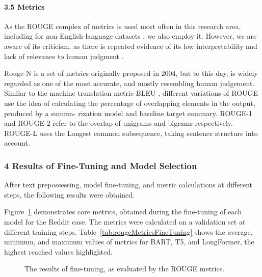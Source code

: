 \paragraph{3.5 Metrics}
As the ROUGE complex of metrics is used most often in this research area, including for non-English-language datasets \cite{ErtamAydin}, we also employ it. However, we are aware of its criticism, as there is repeated evidence of its low interpretability and lack of relevance to human judgment \cite{LiuLiu,KryscinskiKeskarMcCann}.

Rouge-N \cite{Lin} is a set of metrics originally proposed in 2004, but to this day, is widely regarded as one of the most accurate, and mostly resembling human judgement. Similar to the machine translation metric BLEU \cite{PapineniRoukosWard}, different variations of ROUGE use the idea of calculating the percentage of overlapping elements in the output, produced by a summa- rization model and baseline target summary. ROUGE-1 and ROUGE-2 refer to the overlap of unigrams and bigrams respectively. ROUGE-L uses the Longest common subsequence, taking sentence structure into account.

\subsubsection{4 Results of Fine-Tuning and Model Selection}

After text prepossessing, model fine-tuning, and metric calculations at different steps, the following results were obtained.

Figure~\cref{fig:rougeMetricsFineTuning} demonstrates core metrics, obtained during the fine-tuning of each model for the Reddit case. The metrics were calculated on a validation set at different training steps. Table~\cref{tab:rougeMetricsFineTuning} shows the average, minimum, and maximum values of metrics for BART, T5, and LongFormer, the highest reached values highlighted.

\begin{figure}[ht]
	\caption{The results of fine-tuning, as evaluated by the ROUGE metrics.}\label{fig:rougeMetricsFineTuning}
\end{figure}

